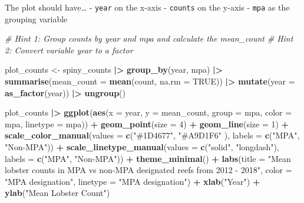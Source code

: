 \documentclass[
]{article}
\newenvironment{Shaded}{\begin{snugshade}}{\end{snugshade}}
\newcommand{\AttributeTok}[1]{\textcolor[rgb]{0.13,0.29,0.53}{#1}}
\newcommand{\CommentTok}[1]{\textcolor[rgb]{0.56,0.35,0.01}{\textit{#1}}}
\newcommand{\ConstantTok}[1]{\textcolor[rgb]{0.56,0.35,0.01}{#1}}
\newcommand{\DecValTok}[1]{\textcolor[rgb]{0.00,0.00,0.81}{#1}}
\newcommand{\FunctionTok}[1]{\textcolor[rgb]{0.13,0.29,0.53}{\textbf{#1}}}
\newcommand{\NormalTok}[1]{#1}
\newcommand{\OtherTok}[1]{\textcolor[rgb]{0.56,0.35,0.01}{#1}}
\newcommand{\SpecialCharTok}[1]{\textcolor[rgb]{0.81,0.36,0.00}{\textbf{#1}}}
\newcommand{\StringTok}[1]{\textcolor[rgb]{0.31,0.60,0.02}{#1}}
\begin{document}
The plot should have\ldots{} - \texttt{year} on the x-axis -
\texttt{counts} on the y-axis - \texttt{mpa} as the grouping variable

\begin{Shaded}
\begin{Highlighting}[]
\CommentTok{\# Hint 1: Group counts by \textasciigrave{}year\textasciigrave{} and \textasciigrave{}mpa\textasciigrave{} and calculate the \textasciigrave{}mean\_count\textasciigrave{}}
\CommentTok{\# Hint 2: Convert variable \textasciigrave{}year\textasciigrave{} to a factor}

\NormalTok{plot\_counts }\OtherTok{\textless{}{-}}\NormalTok{ spiny\_counts }\SpecialCharTok{|\textgreater{}}
    \FunctionTok{group\_by}\NormalTok{(year, mpa) }\SpecialCharTok{|\textgreater{}} 
    \FunctionTok{summarise}\NormalTok{(}\AttributeTok{mean\_count =} \FunctionTok{mean}\NormalTok{(count, }\AttributeTok{na.rm =} \ConstantTok{TRUE}\NormalTok{)) }\SpecialCharTok{|\textgreater{}} 
    \FunctionTok{mutate}\NormalTok{(}\AttributeTok{year =} \FunctionTok{as\_factor}\NormalTok{(year)) }\SpecialCharTok{|\textgreater{}}
    \FunctionTok{ungroup}\NormalTok{()}

\NormalTok{plot\_counts }\SpecialCharTok{|\textgreater{}}  
    \FunctionTok{ggplot}\NormalTok{(}\FunctionTok{aes}\NormalTok{(}\AttributeTok{x =}\NormalTok{ year, }\AttributeTok{y =}\NormalTok{ mean\_count, }\AttributeTok{group =}\NormalTok{ mpa, }\AttributeTok{color =}\NormalTok{ mpa, }\AttributeTok{linetype =}\NormalTok{ mpa)) }\SpecialCharTok{+}
    \FunctionTok{geom\_point}\NormalTok{(}\AttributeTok{size =} \DecValTok{4}\NormalTok{) }\SpecialCharTok{+}
    \FunctionTok{geom\_line}\NormalTok{(}\AttributeTok{size =} \DecValTok{1}\NormalTok{) }\SpecialCharTok{+}
    \FunctionTok{scale\_color\_manual}\NormalTok{(}\AttributeTok{values =} \FunctionTok{c}\NormalTok{(}\StringTok{"\#1D4677"}\NormalTok{, }\StringTok{"\#A9D1F6"}\NormalTok{ ),}
                       \AttributeTok{labels =} \FunctionTok{c}\NormalTok{(}\StringTok{"MPA"}\NormalTok{, }\StringTok{"Non{-}MPA"}\NormalTok{)) }\SpecialCharTok{+}
    \FunctionTok{scale\_linetype\_manual}\NormalTok{(}\AttributeTok{values =} \FunctionTok{c}\NormalTok{(}\StringTok{"solid"}\NormalTok{, }\StringTok{"longdash"}\NormalTok{),}
                          \AttributeTok{labels =} \FunctionTok{c}\NormalTok{(}\StringTok{"MPA"}\NormalTok{, }\StringTok{"Non{-}MPA"}\NormalTok{)) }\SpecialCharTok{+}
    \FunctionTok{theme\_minimal}\NormalTok{() }\SpecialCharTok{+}
    \FunctionTok{labs}\NormalTok{(}\AttributeTok{title =} \StringTok{"Mean lobster counts in MPA vs non{-}MPA designated reefs from 2012 {-} 2018"}\NormalTok{,}
         \AttributeTok{color =} \StringTok{"MPA designation"}\NormalTok{,}
         \AttributeTok{linetype =} \StringTok{"MPA designation"}\NormalTok{) }\SpecialCharTok{+}
    \FunctionTok{xlab}\NormalTok{(}\StringTok{"Year"}\NormalTok{) }\SpecialCharTok{+}
    \FunctionTok{ylab}\NormalTok{(}\StringTok{"Mean Lobster Count"}\NormalTok{)}
\end{Highlighting}
\end{Shaded}
\end{document}

